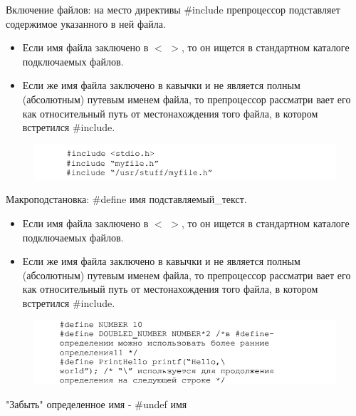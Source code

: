 \documentclass{beamer}
\begin{document}
\begin{frame}
Включение файлов: на место директивы \#include препроцессор подставляет содержимое указанного в ней файла.
\begin{itemize}
\item Если имя файла заключено в $<$ $>$, то он ищется в стандартном каталоге подключаемых файлов.
\item Если же имя файла заключено в кавычки и не является полным (абсолютным) путевым именем файла, то препроцессор рассматри вает его как относительный путь от местонахождения того файла, в котором встретился \#include.
\end{itemize}
\begin{figure}[h]
\centering
\includegraphics[scale=0.5]{images/lec03-pic15.png}
\end{figure}
\end{frame}

\begin{frame}
Макроподстановка: \#define имя подставляемый\_текст.
\begin{itemize}
\item Если имя файла заключено в $<$ $>$, то он ищется в стандартном каталоге подключаемых файлов.
\item Если же имя файла заключено в кавычки и не является полным (абсолютным) путевым именем файла, то препроцессор рассматри вает его как относительный путь от местонахождения того файла, в котором встретился \#include.
\end{itemize}
\begin{figure}[h]
\centering
\includegraphics[scale=0.5]{images/lec03-pic16.png}
\end{figure}
"Забыть" определенное имя - \#undef имя
\end{frame}
\end{document}
